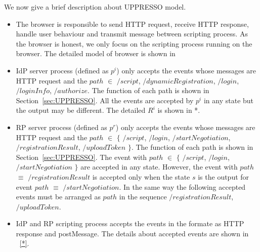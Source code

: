 We now give a brief description about UPPRESSO model.
\begin{itemize}
\item The browser is responsible to send HTTP request, receive HTTP response, handle user behaviour and transmit message between scripting process. As the browser is honest, we only focus on the  scripting process running on the browser. The detailed model of browser is shown in~\cite{SPRESSO} 
\item IdP server process (defined as $p^i$) only accepts the events whose messages are HTTP request and the $path$ $\in$ {$/script$, $/dynamicRegistration$, $/login$, $/loginInfo$, $/authorize$}. The function of each path is shown in Section~\ref{sec:UPPRESSO}.  All the events are accepted by $p^i$ in any state but the output may be different. The detailed $R^i$ is shown in *.  
\item RP server process (defined as $p^r$) only accepts the events whose messages are HTTP request and the $path$ $\in$ $\{$ $/script$, $/login$, $/startNegotiation$,  $/registrationResult$, $/uploadToken$ $\}$. The function of each path is shown in Section~\ref{sec:UPPRESSO}. The event with $path$ $\in$  $\{$ $/script$, $/login$, $/startNegotiation$ $\}$ are accepted in any state. However, the event with $path$ $\equiv$ $/registrationResult$ is accepted only when the state $s$ is the output for event  $path$ $\equiv$ $/startNegotiation$. In the same way the following accepted events must be arranged as $path$  in the sequence $/registrationResult$, $/uploadToken$.
\item IdP and RP scripting process accepts the events in the formate as HTTP response and postMessage. The details about accepted events are shown in ~\ref{*}.
\end{itemize}

